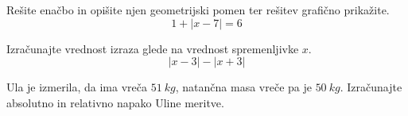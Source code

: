 \documentclass[addpoints]{exam}
\begin{document}
\begin{questions}


        \question
        Rešite enačbo in opišite njen geometrijski pomen ter rešitev grafično prikažite. $$1+\left|x-7\right|=6$$


    
    



    \question
    Izračunajte vrednost izraza glede na vrednost spremenljivke $x$. $$\left|x-3\right|-\left|x+3\right|$$


    \question
    Ula je izmerila, da ima vreča $51~kg$, natančna masa vreče pa je $50~kg$.
    Izračunajte absolutno in relativno napako Uline meritve.











\end{questions}
\end{document}
